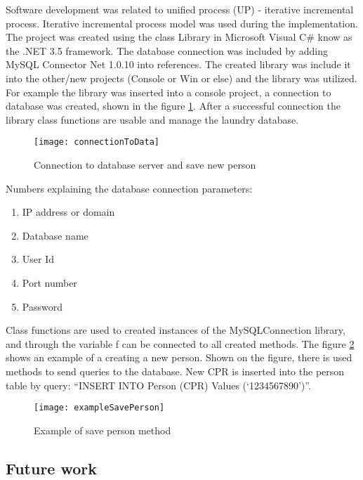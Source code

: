 Software development was related to unified process (UP) - iterative incremental process.  Iterative incremental process model \cite{bib5} was used during the implementation.  
The project was created using the class Library in Microsoft Visual C\# know as the .NET 3.5 framework. The database connection was included by adding MySQL Connector Net 1.0.10 into references. The created library was include it into the other/new projects (Console or Win or else) and the library was utilized. For example the library was  inserted into a console project, a connection to database was created, shown in the figure \ref{fig:connectionToData}. After a successful connection the library class functions are usable and manage the laundry database. 

\begin{figure}[h]
	\centering
		\texttt{[image: connectionToData]}
	\caption{Connection to database server and save new person}
	\label{fig:connectionToData}
\end{figure}

Numbers explaining the database connection parameters:

\begin{enumerate}
	\item IP address or domain
	\item Database name
	\item User Id
	\item Port number
	\item Password
\end{enumerate}

Class functions are used to created instances of the MySQLConnection library, and through the variable f can be connected to all created methods. The figure \ref{fig:exampleSavePerson} shows an example of a creating a new person. Shown on the figure, there is used methods to send queries to the database. New CPR is inserted into the person table by query: “INSERT INTO Person (CPR) Values (‘1234567890’)”.

\begin{figure}[h]
	\centering
		\texttt{[image: exampleSavePerson]}
	\caption{Example of save person method}
	\label{fig:exampleSavePerson}
\end{figure}

\subsection{Future work}